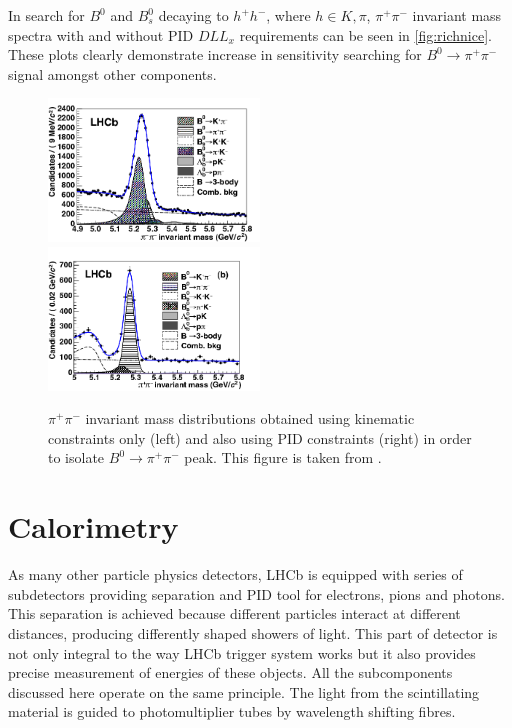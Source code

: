 In search for $B^{0}$ and $B^{0}_{s}$ decaying to $h^{+}h^{-}$, where $h\in K, \pi$, $\pi^{+} \pi^{-}$ invariant mass spectra with and without PID $DLL_{x}$ requirements can be seen in \autoref{fig:richnice}. These plots clearly demonstrate increase in sensitivity searching for $B^{0} \rightarrow \pi^{+} \pi^{-}$ signal amongst other components. 

\begin{figure}[!h]
	\centering
	\includegraphics[width = 0.5\textwidth]{figs/detector/b2hhnopid.png}%
	\includegraphics[width = 0.5\textwidth]{figs/detector/b2hhpid.png}%
	\caption{ $\pi^{+} \pi^{-}$ invariant mass distributions obtained using kinematic constraints only (left) and also using PID constraints (right) in order to isolate $B^{0} \rightarrow \pi^{+} \pi^{-}$ peak. This figure is taken from \cite{LHCb-PAPER-2012-002}. }  
	\label{fig:richnice}
\end{figure}


\section{Calorimetry}
As many other particle physics detectors, \Gls{LHCb} is equipped with series of subdetectors providing separation and \Gls{PID} tool for electrons, pions and photons. This separation is achieved because different particles interact at different distances, producing differently shaped showers of light. This part of detector is not only integral to the way \Gls{LHCb} trigger system works but it also provides precise measurement of energies of these objects.
All the subcomponents discussed here operate on the same principle. The light from the scintillating material is guided to photomultiplier tubes by wavelength shifting fibres.

